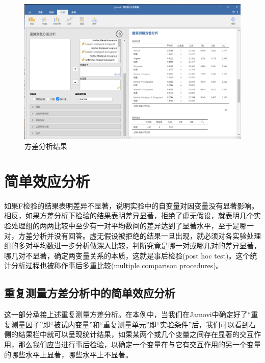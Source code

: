 \documentclass[]{ctexbook}
\theoremstyle{definition}
\theoremstyle{definition}
\theoremstyle{definition}
\theoremstyle{definition}
\theoremstyle{remark}
\begin{document}
\begin{figure}

{\centering \includegraphics[width=1\linewidth]{img/jamovi/rmanova-result} 

}

\caption{方差分析结果}\label{fig:jamovi-rmanova-result}
\end{figure}

\section{简单效应分析}\label{ux7b80ux5355ux6548ux5e94ux5206ux6790}

如果F检验的结果表明差异不显著，说明实验中的自变量对因变量没有显著影响。相反，如果方差分析下检验的结果表明差异显著，拒绝了虚无假设，就表明几个实验处理组的两两比较中至少有一对平均数间的差异达到了显著水平，至于是哪一对，方差分析并没有回答。虚无假设被拒绝的结果一旦出现，就必须对各实验处理组的多对平均数进一步分析做深入比较，判断究竟是哪一对或哪几对的差异显著，哪几对不显著，确定两变量关系的本质，这就是事后检验(post hoc test)。这个统计分析过程也被称作事后多重比较(multiple comparison procedures)。

\subsection{重复测量方差分析中的简单效应分析}\label{ux91cdux590dux6d4bux91cfux65b9ux5deeux5206ux6790ux4e2dux7684ux7b80ux5355ux6548ux5e94ux5206ux6790}

这一部分承接上述重复测量方差分析。在本例中，当我们在Jamovi中确定好了``重复测量因子''即``被试内变量''和``重复测量单元''即``实验条件''后，我们可以看到右侧的结果栏中就可以呈现统计结果，如果某两个或几个变量之间存在显著的交互作用，那么我们应当进行事后检验，以确定一个变量在与它有交互作用的另一个变量的哪些水平上显著，哪些水平上不显著。
\end{document}
